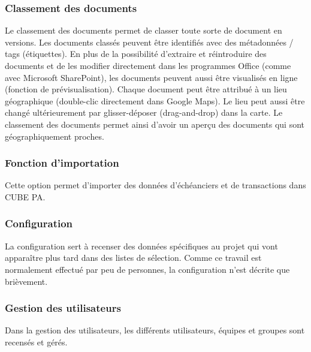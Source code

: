 \subsubsection{Classement des documents} %

Le classement des documents permet de classer toute sorte de document en versions. Les documents classés peuvent être identifiés avec des métadonnées / tags (étiquettes). En plus de la possibilité d'extraire et réintroduire des documents et de les modifier directement dans les programmes Office (comme avec Microsoft SharePoint), les documents peuvent aussi être visualisés en ligne (fonction de prévisualisation). Chaque document peut être attribué à un lieu géographique (double-clic directement dans Google Maps). Le lieu peut aussi être changé ultérieurement par glisser-déposer (drag-and-drop) dans la carte. Le classement des documents permet ainsi d'avoir un aperçu des documents qui sont géographiquement proches.

\subsubsection{Fonction d'importation} %

Cette option permet d'importer des données d'échéanciers et de transactions dans CUBE PA.

\subsubsection{Configuration} %

La configuration sert à recenser des données spécifiques au projet qui vont apparaître plus tard dans des listes de sélection. Comme ce travail est normalement effectué par peu de personnes, la configuration n'est décrite que brièvement.

\subsubsection{Gestion des utilisateurs} %

Dans la gestion des utilisateurs, les différents utilisateurs, équipes et groupes sont recensés et gérés.
